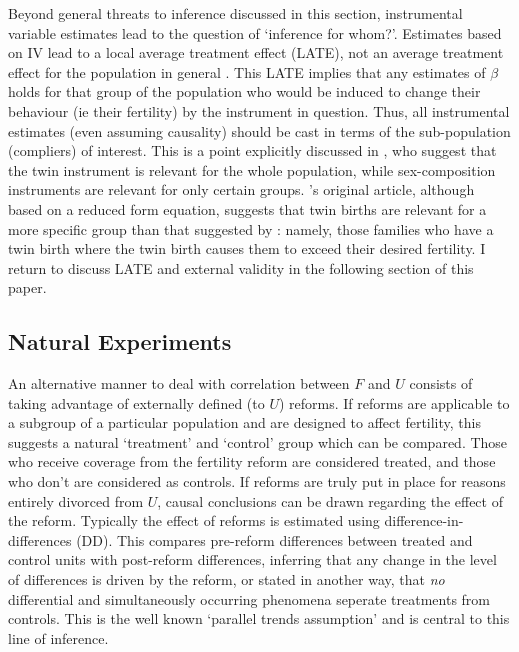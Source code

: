 Beyond general threats to inference discussed in this section, instrumental 
variable estimates lead to the question of `inference for whom?'.  Estimates 
based on IV lead to a local average treatment effect (LATE), not an average 
treatment effect for the population in general \citep{ImbensAngrist1994,
Ebenstein2009}.  This LATE implies that any estimates of $\beta$ holds for that 
group of the population who would be induced to change their behaviour (ie their 
fertility) by the instrument in question. Thus, all instrumental estimates (even 
assuming causality) should be cast in terms of the sub-population (compliers) of 
interest.  This is a point explicitly discussed in \citet{Angristetal2010}, who 
suggest that the twin instrument is relevant for the whole population, while 
sex-composition instruments are relevant for only certain groups. 
\citet{RosenzweigWolpin1980}'s original article, although based on a reduced 
form equation, suggests that twin births are relevant for a more specific group 
than that suggested by \citet{Angristetal2010}: namely, those families who have 
a twin birth where the twin birth causes them to exceed their desired fertility. 
I return to discuss LATE and external validity in the following section of this 
paper.



\subsection{Natural Experiments}
\label{Fsscn:kidNExp}
An alternative manner to deal with correlation between $F$ and $U$ consists of
taking advantage of externally defined (to $U$) reforms.  If reforms are 
applicable to a subgroup of a particular population and are designed to affect
fertility, this suggests a natural `treatment' and `control' group which can
be compared. Those who receive coverage from the fertility reform are considered 
treated, and those who don't are considered as controls.  If reforms are truly 
put in place for reasons entirely divorced from $U$, causal conclusions can be 
drawn regarding the effect of the reform.  Typically the effect of reforms is 
estimated using difference-in-differences (DD).  This compares pre-reform 
differences between treated and control units with post-reform differences, 
inferring that any change in the level of differences is driven by the reform, 
or stated in another way, that \emph{no} differential and simultaneously 
occurring phenomena seperate treatments from controls.  This is the well known 
`parallel trends assumption' and is central to this line of inference.

